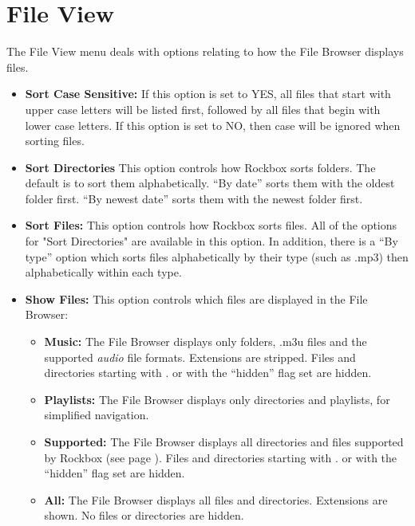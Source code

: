 \section{File View}
  The File View menu deals with options relating to how the File Browser displays files.
  
  \begin{itemize}
  \item \textbf{Sort Case Sensitive:  }
    If this option is set to YES, all files that start with upper case letters will be listed first, followed by all files that begin with lower case letters.  If this option is set to NO, then case will be ignored when sorting files.
  \item \textbf{Sort Directories}
    This option controls how Rockbox sorts folders.  The default is to sort them alphabetically. ``By date'' sorts them with the oldest folder first.  ``By newest date'' sorts them with the newest folder first.
    
  \item \textbf{Sort Files:  }
    This option controls how Rockbox sorts files.  All of the options for "Sort Directories" are available in this option.  In addition, there is a ``By type'' option which sorts files alphabetically by their type (such as .mp3) then alphabetically within each type.
    
  \item \textbf{\label{ref:ShowFiles}Show Files:  }
    This option controls which files are displayed in the File Browser:
    
    \begin{itemize}
    \item \textbf{Music: }The File Browser displays only folders, .m3u files and the supported \emph{audio} file formats.  Extensions are stripped.  Files and directories starting with . or with the ``hidden'' flag set are hidden.
    \item \textbf{Playlists:  }The File Browser displays only directories and playlists, for simplified navigation.
    \item \textbf{Supported:  }The File Browser displays all directories and files supported by Rockbox (see page \pageref{ref:Supportedfileformats}).  Files and directories starting with . or with the ``hidden'' flag set are hidden.
    \item \textbf{All:  }The File Browser displays all files and directories. Extensions are shown. No files or directories are hidden.
    \end{itemize}
    

\end{itemize}
